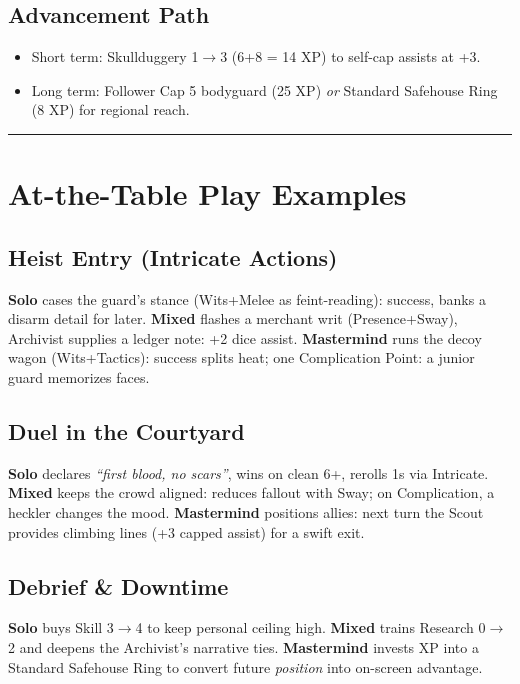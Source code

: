 \documentclass[12pt]{article}
\begin{document}
\subsection*{Advancement Path}
\begin{itemize}
  \item Short term: Skullduggery 1$\rightarrow$3 (6+8 = 14 XP) to self-cap assists at +3.
  \item Long term: Follower Cap 5 bodyguard (25 XP) \emph{or} Standard Safehouse Ring (8 XP) for regional reach.
\end{itemize}

\bigskip
\hrule
\bigskip

\section{At-the-Table Play Examples}

\subsection*{Heist Entry (Intricate Actions)}
\textbf{Solo} cases the guard’s stance (Wits+Melee as feint-reading): success, banks a disarm detail for later.  
\textbf{Mixed} flashes a merchant writ (Presence+Sway), Archivist supplies a ledger note: +2 dice assist.  
\textbf{Mastermind} runs the decoy wagon (Wits+Tactics): success splits heat; one Complication Point: a junior guard memorizes faces.

\subsection*{Duel in the Courtyard}
\textbf{Solo} declares \emph{``first blood, no scars''}, wins on clean 6+, rerolls 1s via Intricate.  
\textbf{Mixed} keeps the crowd aligned: reduces fallout with Sway; on Complication, a heckler changes the mood.  
\textbf{Mastermind} positions allies: next turn the Scout provides climbing lines (+3 capped assist) for a swift exit.

\subsection*{Debrief \& Downtime}
\textbf{Solo} buys Skill 3$\rightarrow$4 to keep personal ceiling high.  
\textbf{Mixed} trains Research 0$\rightarrow$2 and deepens the Archivist’s narrative ties.  
\textbf{Mastermind} invests XP into a Standard Safehouse Ring to convert future \emph{position} into on-screen advantage.
\end{document}
